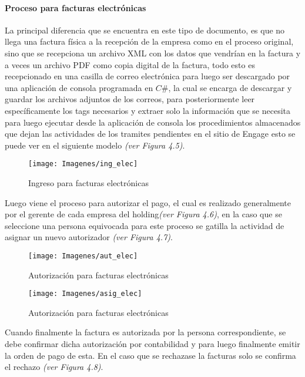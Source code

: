 	\paragraph{Proceso para facturas electrónicas} 
	La principal diferencia que se encuentra en este tipo de documento, es que no llega una factura física a la recepción de la empresa como en el proceso original, sino que se recepciona un archivo XML con los datos que vendrían en la factura y a veces un archivo PDF como copia digital de la factura, todo esto es recepcionado en una casilla de correo electrónica para luego ser descargado por una aplicación de consola programada en $C\#$, la cual se encarga de descargar y guardar los archivos adjuntos de los correos, para posteriormente leer específicamente los tags necesarios y extraer solo la información que se necesita para luego ejecutar desde la aplicación de consola los procedimientos almacenados que dejan las actividades de los tramites pendientes en el sitio de Engage esto se puede ver en el siguiente modelo \textit{(ver Figura 4.5)}.
	
	\begin{figure}[H]
		\centering
		\texttt{[image: Imagenes/ing\_elec]}
		\caption{Ingreso para facturas electrónicas}
	\end{figure}
	
	Luego viene el proceso para autorizar el pago, el cual es realizado generalmente por el gerente de cada empresa del holding\textit{(ver Figura 4.6)}, en la caso que se seleccione una persona equivocada para este proceso se gatilla la actividad de asignar un nuevo autorizador \textit{(ver Figura 4.7)}.
	
	
	\begin{figure}[H]
		\centering
		\texttt{[image: Imagenes/aut\_elec]}
		\caption{Autorización para facturas electrónicas}
	\end{figure}
	
	\begin{figure}[H]
		\centering
		\texttt{[image: Imagenes/asig\_elec]}
		\caption{Autorización para facturas electrónicas}
	\end{figure}
	
	Cuando finalmente la factura es autorizada por la persona correspondiente, se debe confirmar dicha autorización por contabilidad y para luego finalmente emitir la orden de pago de esta. En el caso que se rechazase la facturas solo se confirma el rechazo \textit{(ver Figura 4.8)}.
	
